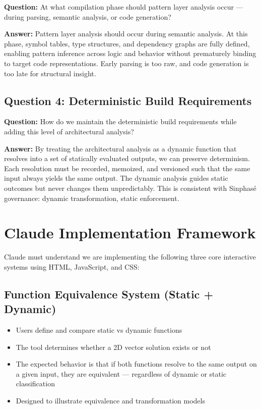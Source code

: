 \documentclass{article}
\begin{document}
\textbf{Question:} At what compilation phase should pattern layer analysis occur — during parsing, semantic analysis, or code generation?

\textbf{Answer:} Pattern layer analysis should occur during semantic analysis. At this phase, symbol tables, type structures, and dependency graphs are fully defined, enabling pattern inference across logic and behavior without prematurely binding to target code representations. Early parsing is too raw, and code generation is too late for structural insight.

\subsection{Question 4: Deterministic Build Requirements}

\textbf{Question:} How do we maintain the deterministic build requirements while adding this level of architectural analysis?

\textbf{Answer:} By treating the architectural analysis as a dynamic function that resolves into a set of statically evaluated outputs, we can preserve determinism. Each resolution must be recorded, memoized, and versioned such that the same input always yields the same output. The dynamic analysis guides static outcomes but never changes them unpredictably. This is consistent with Sinphasé governance: dynamic transformation, static enforcement.

\section{Claude Implementation Framework}

Claude must understand we are implementing the following three core interactive systems using HTML, JavaScript, and CSS:

\subsection{Function Equivalence System (Static + Dynamic)}
\begin{itemize}
    \item Users define and compare static vs dynamic functions
    \item The tool determines whether a 2D vector solution exists or not
    \item The expected behavior is that if both functions resolve to the same output on a given input, they are equivalent — regardless of dynamic or static classification
    \item Designed to illustrate equivalence and transformation models
\end{itemize}
\end{document}
